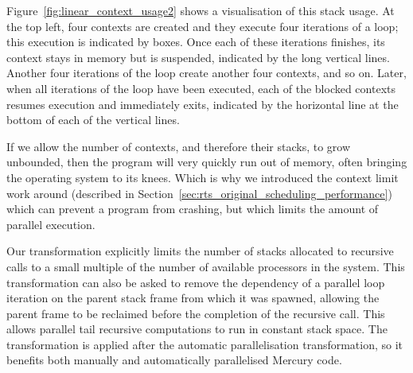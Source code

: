
Figure~\ref{fig:linear_context_usage2} shows a visualisation of this stack
usage.
At the top left,
four contexts are created and they execute four iterations of a loop;
this execution is indicated by boxes.
Once each of these iterations finishes,
its context stays in memory but is suspended,
indicated by the long vertical lines.
Another four iterations of the loop create another four contexts, and so on.
Later, when all iterations of the loop have been executed,
each of the blocked contexts resumes execution and immediately exits,
indicated by the horizontal line at the bottom of each of the vertical
lines.

If we allow the number of contexts, and therefore their stacks, to grow
unbounded, then the program will very quickly run out of memory,
often bringing the operating system to its knees.
Which is why we introduced the context limit work around
(described in Section~\ref{sec:rts_original_scheduling_performance})
which can prevent a program from crashing,
but which limits the amount of parallel execution.

%

Our transformation explicitly limits
the number of stacks allocated to recursive calls
to a small multiple of the number of available processors in the system.
This transformation can also be asked
to remove the dependency of a parallel loop iteration
on the parent stack frame from which it was spawned,
allowing the parent frame to be reclaimed
before the completion of the recursive call.
This allows parallel tail recursive computations
to run in constant stack space.
The transformation is applied
after the automatic parallelisation transformation,
so it benefits both manually and automatically parallelised Mercury code.


